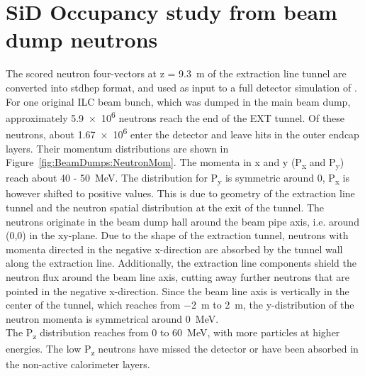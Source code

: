 \section{SiD Occupancy study from beam dump neutrons}
\label{BeamDumps:SiDocc}
The scored neutron four-vectors at z = \SI{9.3}{\meter} of the extraction line tunnel are converted into stdhep format, and used as input to a full detector simulation of \sid.
For one original ILC beam bunch, which was dumped in the main beam dump, approximately \num{5.9e6} neutrons reach the end of the EXT tunnel.
Of these neutrons, about \num{1.67e6} enter the \sid detector and leave hits in the outer endcap layers.
Their momentum distributions are shown in Figure~\ref{fig:BeamDumps:NeutronMom}.
The momenta in x and y (P\textsubscript{x} and P\textsubscript{y}) reach about 40 - \SI{50}{\MeV}.
The distribution for P\textsubscript{y} is symmetric around 0, P\textsubscript{x} is however shifted to positive values.
This is due to geometry of the extraction line tunnel and the neutron spatial distribution at the exit of the tunnel.
The neutrons originate in the beam dump hall around the beam pipe axis, i.e. around (0,0) in the xy-plane.
Due to the shape of the extraction tunnel, neutrons with momenta directed in the negative x-direction are absorbed by the tunnel wall along the extraction line.
Additionally, the extraction line components shield the neutron flux around the beam line axis, cutting away further neutrons that are pointed in the negative x-direction.
Since the beam line axis is vertically in the center of the tunnel, which reaches from \SI{-2}{\meter} to \SI{2}{\meter}, the y-distribution of the neutron momenta is symmetrical around \SI{0}{\MeV}.
\\The P\textsubscript{z} distribution reaches from 0 to \SI{60}{\MeV}, with more particles at higher energies.
The low P\textsubscript{z} neutrons have missed the detector or have been absorbed in the non-active calorimeter layers.
